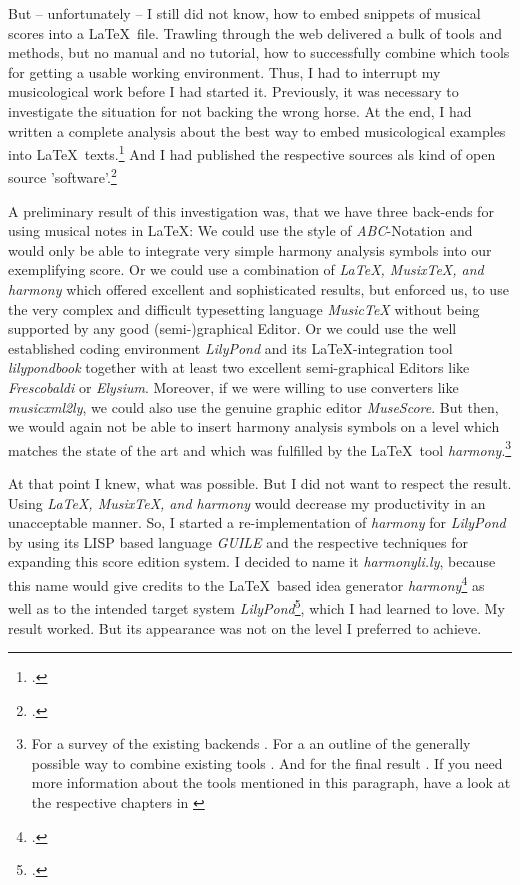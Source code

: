 \documentclass[
  DIV=calc,
  BCOR=5mm,
  12pt,
  headings=small,
  oneside,
  abstract=true,
  toc=bib,
  xcolor=dvipsnames,
  openany,
  ngerman,english]{scrartcl}
\newcommand{\acc}[0]{\textit}
\begin{document}
But -- unfortunately -- I still did not know, how to embed snippets of musical
scores into a \LaTeX\ file. Trawling through the web delivered a bulk of tools
and methods, but no manual and no tutorial, how to successfully combine which
tools for getting a usable working environment. Thus, I had to interrupt my
musicological work before I had started it. Previously, it was necessary to
investigate the situation for not backing the wrong horse. At the end, I had
written a complete analysis about the best way to embed musicological examples
into \LaTeX\ texts.\footcite[cf.][\nopage]{reincke2019c} And I had published the
respective sources als kind of open source
'software'.\footcite[cf.][\nopage]{reincke2019a}

A preliminary result of this investigation was, that we have three back-ends for
using musical notes in \LaTeX: We could use the style of \acc{ABC}-Notation and
would only be able to integrate very simple harmony analysis symbols into our
exemplifying score. Or we could use a combination of \acc{\LaTeX, Musix\TeX, and
harmony} which offered excellent and sophisticated results, but enforced us, to
use the very complex and difficult typesetting language \acc{MusicTeX} without
being supported by any good (semi-)graphical Editor. Or we could use the well
established coding environment \acc{LilyPond} and its \LaTeX-integration tool
\acc{lilypondbook} together with at least two excellent semi-graphical Editors
like \acc{Frescobaldi} or \acc{Elysium}. Moreover, if we were willing to use
converters like \acc{music\-xml2ly}, we could also use the genuine graphic editor
\acc{MuseScore}. But then, we would again not be able to insert harmony
analysis symbols on a level which matches the state of the art and which was
fulfilled by the \LaTeX\ tool \acc{harmony}.\footnote{For a survey of the
existing backends \cite[cf.][19ff]{reincke2019c}. For a an outline of the
generally possible way to combine existing tools \cite[cf.][91f]{reincke2019c}.
And for the final result \cite[cf.][100f]{reincke2019c}. If you need more
information about the tools mentioned in this paragraph, have a look at the
respective chapters in \cite[cf.][\nopage et passim]{reincke2019c}}

At that point I knew, what was possible. But I did not want to respect the
result. Using \acc{\LaTeX, Musix\TeX, and harmony} would decrease my
productivity in an unacceptable manner. So, I started a re-implementation of
\acc{harmony} for \acc{LilyPond} by using its LISP based language \acc{GUILE}
and the respective techniques for expanding this score edition system. I decided
to name it \acc{harmonyli.ly}, because this name would give credits to the
\LaTeX\ based idea generator \acc{harmony}\footcite[cf.][\nopage]{WegWeg2007a}
as well as to the intended target system \acc{LilyPond}\footcite[cf.][\nopage
wp]{LilyPond2018a}, which I had learned to love. My result worked. But its
appearance was not on the level I preferred to achieve.
\end{document}
